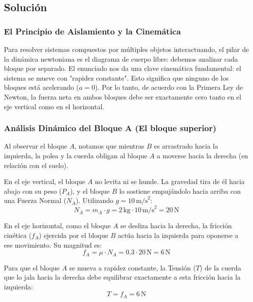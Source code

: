 \documentclass[12pt]{article}
\begin{document}
\subsection*{Solución}

\subsubsection*{El Principio de Aislamiento y la Cinemática}
Para resolver sistemas compuestos por múltiples objetos interactuando, el pilar de la dinámica newtoniana es el diagrama de cuerpo libre: debemos analizar cada bloque por separado. 
El enunciado nos da una clave cinemática fundamental: el sistema se mueve con "rapidez constante". Esto significa que ninguno de los bloques está acelerando ($a = 0$). Por lo tanto, de acuerdo con la Primera Ley de Newton, la fuerza neta en ambos bloques debe ser exactamente cero tanto en el eje vertical como en el horizontal.

\subsubsection*{Análisis Dinámico del Bloque A (El bloque superior)}
Al observar el bloque $A$, notamos que mientras $B$ es arrastrado hacia la izquierda, la polea y la cuerda obligan al bloque $A$ a moverse hacia la derecha (en relación con el suelo).

En el eje vertical, el bloque $A$ no levita ni se hunde. La gravedad tira de él hacia abajo con su peso ($P_A$), y el bloque $B$ lo sostiene empujándolo hacia arriba con una Fuerza Normal ($N_A$). Utilizando $g = 10 \, \text{m/s}^2$:
\begin{equation}
    N_A = m_A \cdot g = 2 \, \text{kg} \cdot 10 \, \text{m/s}^2 = 20 \, \text{N}
\end{equation}

En el eje horizontal, como el bloque $A$ se desliza hacia la derecha, la fricción cinética ($f_A$) ejercida por el bloque $B$ actúa hacia la izquierda para oponerse a ese movimiento. Su magnitud es:
\begin{equation}
    f_A = \mu \cdot N_A = 0.3 \cdot 20 \, \text{N} = 6 \, \text{N}
\end{equation}

Para que el bloque $A$ se mueva a rapidez constante, la Tensión ($T$) de la cuerda que lo jala hacia la derecha debe equilibrar exactamente a esta fricción hacia la izquierda:
\begin{equation}
    T = f_A = 6 \, \text{N}
\end{equation}
\end{document}
